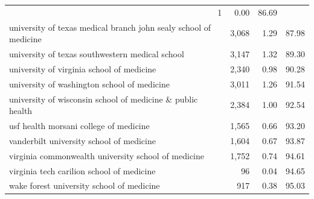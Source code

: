 \begin{table}[!h]
\begin{tabular}{llll}
  \multicolumn{1}{r}{1} &
  \multicolumn{1}{r}{0.00} &
  \multicolumn{1}{r}{86.69} \\
\multicolumn{1}{l}{\hspace{1em}university of texas medical branch john sealy school of medicine} &
  \multicolumn{1}{r}{3,068} &
  \multicolumn{1}{r}{1.29} &
  \multicolumn{1}{r}{87.98} \\
\multicolumn{1}{l}{\hspace{1em}university of texas southwestern medical school} &
  \multicolumn{1}{r}{3,147} &
  \multicolumn{1}{r}{1.32} &
  \multicolumn{1}{r}{89.30} \\
\multicolumn{1}{l}{\hspace{1em}university of virginia school of medicine} &
  \multicolumn{1}{r}{2,340} &
  \multicolumn{1}{r}{0.98} &
  \multicolumn{1}{r}{90.28} \\
\multicolumn{1}{l}{\hspace{1em}university of washington school of medicine} &
  \multicolumn{1}{r}{3,011} &
  \multicolumn{1}{r}{1.26} &
  \multicolumn{1}{r}{91.54} \\
\multicolumn{1}{l}{\hspace{1em}university of wisconsin school of medicine \& public health} &
  \multicolumn{1}{r}{2,384} &
  \multicolumn{1}{r}{1.00} &
  \multicolumn{1}{r}{92.54} \\
\multicolumn{1}{l}{\hspace{1em}usf health morsani college of medicine} &
  \multicolumn{1}{r}{1,565} &
  \multicolumn{1}{r}{0.66} &
  \multicolumn{1}{r}{93.20} \\
\multicolumn{1}{l}{\hspace{1em}vanderbilt university school of medicine} &
  \multicolumn{1}{r}{1,604} &
  \multicolumn{1}{r}{0.67} &
  \multicolumn{1}{r}{93.87} \\
\multicolumn{1}{l}{\hspace{1em}virginia commonwealth university school of medicine} &
  \multicolumn{1}{r}{1,752} &
  \multicolumn{1}{r}{0.74} &
  \multicolumn{1}{r}{94.61} \\
\multicolumn{1}{l}{\hspace{1em}virginia tech carilion school of medicine} &
  \multicolumn{1}{r}{96} &
  \multicolumn{1}{r}{0.04} &
  \multicolumn{1}{r}{94.65} \\
\multicolumn{1}{l}{\hspace{1em}wake forest university school of medicine} &
  \multicolumn{1}{r}{917} &
  \multicolumn{1}{r}{0.38} &
  \multicolumn{1}{r}{95.03} \\

\end{tabular}
\end{table}
